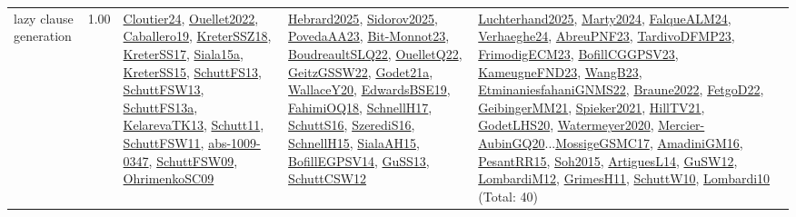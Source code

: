 {\begin{longtable}{p{3cm}r>{\raggedright\arraybackslash}p{6cm}>{\raggedright\arraybackslash}p{6cm}>{\raggedright\arraybackslash}p{8cm}}
\index{lazy clause generation}\index{Algorithms!lazy clause generation}lazy clause generation &  1.00 & \hyperref[detail:Cloutier24]{Cloutier24}, \hyperref[detail:Ouellet2022]{Ouellet2022}, \hyperref[detail:Caballero19]{Caballero19}, \hyperref[detail:KreterSSZ18]{KreterSSZ18}, \hyperref[detail:KreterSS17]{KreterSS17}, \hyperref[detail:Siala15a]{Siala15a}, \hyperref[detail:KreterSS15]{KreterSS15}, \hyperref[detail:SchuttFS13]{SchuttFS13}, \hyperref[detail:SchuttFSW13]{SchuttFSW13}, \hyperref[detail:SchuttFS13a]{SchuttFS13a}, \hyperref[detail:KelarevaTK13]{KelarevaTK13}, \hyperref[detail:Schutt11]{Schutt11}, \hyperref[detail:SchuttFSW11]{SchuttFSW11}, \hyperref[detail:abs-1009-0347]{abs-1009-0347}, \hyperref[detail:SchuttFSW09]{SchuttFSW09}, \hyperref[detail:OhrimenkoSC09]{OhrimenkoSC09} & \hyperref[detail:Hebrard2025]{Hebrard2025}, \hyperref[detail:Sidorov2025]{Sidorov2025}, \hyperref[detail:PovedaAA23]{PovedaAA23}, \hyperref[detail:Bit-Monnot23]{Bit-Monnot23}, \hyperref[detail:BoudreaultSLQ22]{BoudreaultSLQ22}, \hyperref[detail:OuelletQ22]{OuelletQ22}, \hyperref[detail:GeitzGSSW22]{GeitzGSSW22}, \hyperref[detail:Godet21a]{Godet21a}, \hyperref[detail:WallaceY20]{WallaceY20}, \hyperref[detail:EdwardsBSE19]{EdwardsBSE19}, \hyperref[detail:FahimiOQ18]{FahimiOQ18}, \hyperref[detail:SchnellH17]{SchnellH17}, \hyperref[detail:SchuttS16]{SchuttS16}, \hyperref[detail:SzerediS16]{SzerediS16}, \hyperref[detail:SchnellH15]{SchnellH15}, \hyperref[detail:SialaAH15]{SialaAH15}, \hyperref[detail:BofillEGPSV14]{BofillEGPSV14}, \hyperref[detail:GuSS13]{GuSS13}, \hyperref[detail:SchuttCSW12]{SchuttCSW12} & \hyperref[detail:Luchterhand2025]{Luchterhand2025}, \hyperref[detail:Marty2024]{Marty2024}, \hyperref[detail:FalqueALM24]{FalqueALM24}, \hyperref[detail:Verhaeghe24]{Verhaeghe24}, \hyperref[detail:AbreuPNF23]{AbreuPNF23}, \hyperref[detail:TardivoDFMP23]{TardivoDFMP23}, \hyperref[detail:FrimodigECM23]{FrimodigECM23}, \hyperref[detail:BofillCGGPSV23]{BofillCGGPSV23}, \hyperref[detail:KameugneFND23]{KameugneFND23}, \hyperref[detail:WangB23]{WangB23}, \hyperref[detail:EtminaniesfahaniGNMS22]{EtminaniesfahaniGNMS22}, \hyperref[detail:Braune2022]{Braune2022}, \hyperref[detail:FetgoD22]{FetgoD22}, \hyperref[detail:GeibingerMM21]{GeibingerMM21}, \hyperref[detail:Spieker2021]{Spieker2021}, \hyperref[detail:HillTV21]{HillTV21}, \hyperref[detail:GodetLHS20]{GodetLHS20}, \hyperref[detail:Watermeyer2020]{Watermeyer2020}, \hyperref[detail:Mercier-AubinGQ20]{Mercier-AubinGQ20}...\hyperref[detail:MossigeGSMC17]{MossigeGSMC17}, \hyperref[detail:AmadiniGM16]{AmadiniGM16}, \hyperref[detail:PesantRR15]{PesantRR15}, \hyperref[detail:Soh2015]{Soh2015}, \hyperref[detail:ArtiguesL14]{ArtiguesL14}, \hyperref[detail:GuSW12]{GuSW12}, \hyperref[detail:LombardiM12]{LombardiM12}, \hyperref[detail:GrimesH11]{GrimesH11}, \hyperref[detail:SchuttW10]{SchuttW10}, \hyperref[detail:Lombardi10]{Lombardi10} (Total: 40)\\

\end{longtable}}
